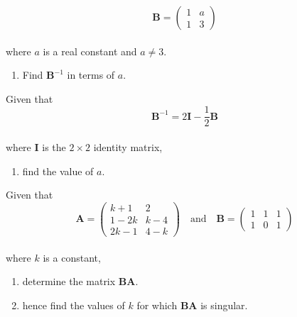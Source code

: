 \documentclass[leqno]{article}
\begin{document}
\djsFrontMatter
\begin{enumerate}[
  label=\textbf{\arabic*.},
  leftmargin=*,
  topsep=0pt,
  partopsep=0pt,
  parsep=0pt
]

\questionitem

\[
\mathbf{B} = \begin{pmatrix} 1 & a \\ 1 & 3 \end{pmatrix}
\] \\
where $a$ is a real constant and $a \neq 3$. \\

\begin{enumerate}[label=\textbf{(\alph*)}]
  \item Find $\mathbf{B}^{-1}$ in terms of $a$.  \\
\end{enumerate}

Given that
\[
\mathbf{B}^{-1} = 2\mathbf{I} - \frac{1}{2}\mathbf{B}
\] \\
where $\mathbf{I}$ is the $2 \times 2$ identity matrix, \\

\begin{enumerate}[label=\textbf{(\alph*)}, resume]
  \item find the value of $a$.  \\
\end{enumerate}


\newpage

\questionitem

Given that
\[
\mathbf{A}=\begin{pmatrix}k+1 & 2\\ 1-2k & k-4\\ 2k-1 & 4-k\end{pmatrix}
\quad \text{and} \quad
\mathbf{B}=\begin{pmatrix}1 & 1 & 1\\ 1 & 0 & 1\end{pmatrix}
\] \\
where $k$ is a constant, \\

\begin{enumerate}[label=\textbf{(\alph*)}]
  \item determine the matrix $\mathbf{BA}$.  \\
  \item hence find the values of $k$ for which $\mathbf{BA}$ is singular.  \\
\end{enumerate}


\end{enumerate}
\end{document}
